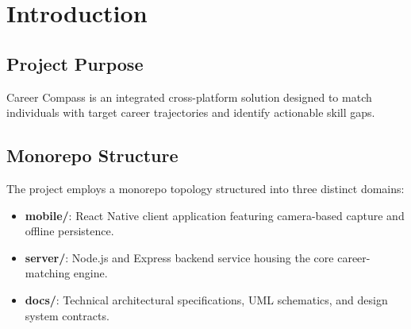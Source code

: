\section{Introduction}
\subsection{Project Purpose}
Career Compass is an integrated cross-platform solution designed to match individuals with target career trajectories and identify actionable skill gaps. 

\subsection{Monorepo Structure}
The project employs a monorepo topology structured into three distinct domains:
\begin{itemize}
    \item \textbf{mobile/}: React Native client application featuring camera-based capture and offline persistence.
    \item \textbf{server/}: Node.js and Express backend service housing the core career-matching engine.
    \item \textbf{docs/}: Technical architectural specifications, UML schematics, and design system contracts.
\end{itemize}
